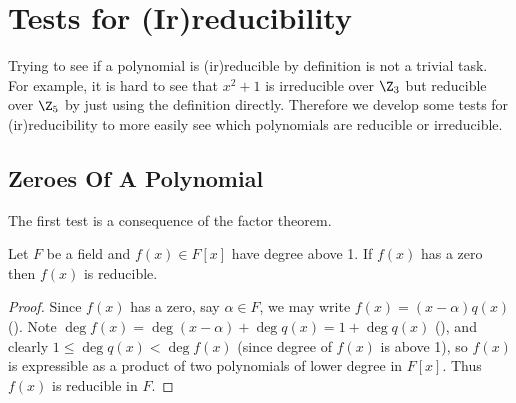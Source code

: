 \section{Tests for (Ir)reducibility}
Trying to see if a polynomial is (ir)reducible by definition is not a trivial task. For example, it is hard to see that $x^2 + 1$ is irreducible over $\Z_3$ but reducible over $\Z_5$ by just using the definition directly. Therefore we develop some tests for (ir)reducibility to more easily see which polynomials are reducible or irreducible.

\subsection{Zeroes Of A Polynomial}
The first test is a consequence of the factor theorem.
\begin{theorem}\label{thrm-degree-above-1-reducible-if-has-zero}
    Let $F$ be a field and $f(x) \in F[x]$ have degree above 1. If $f(x)$ has a zero then $f(x)$ is reducible.
\end{theorem}
\begin{proof}
    Since $f(x)$ has a zero, say $\alpha \in F$, we may write $f(x) = (x-\alpha)q(x)$ (). Note $\deg f(x) = \deg(x-\alpha) + \deg q(x) = 1 + \deg q(x)$ (), and clearly $1 \leq \deg q(x) < \deg f(x)$ (since degree of $f(x)$ is above 1), so $f(x)$ is expressible as a product of two polynomials of lower degree in $F[x]$. Thus $f(x)$ is reducible in $F$. 
\end{proof}

